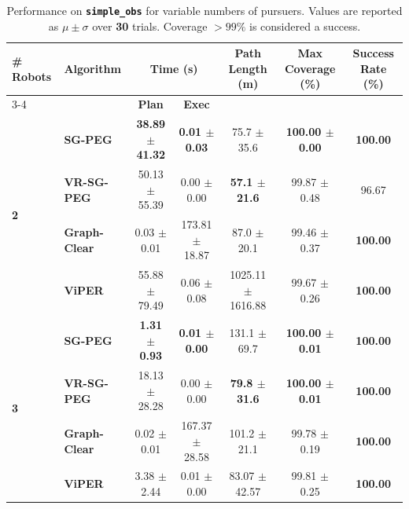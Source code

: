 \documentclass[conference]{IEEEtran}
\begin{document}
\begin{table}[t]
	\centering
	\caption{Performance on \textbf{\texttt{simple\_obs}} for variable numbers of pursuers. Values are reported as $\mu \pm \sigma$ over \textbf{30} trials. Coverage $>99\%$ is considered a success.}
	\label{tab:k_comparison}
	\renewcommand{\arraystretch}{1.2}
	\setlength{\tabcolsep}{6pt}
	
	\begin{tabular}{l l cc c c c}
		\toprule
		
		\multirow{2}{*}{\textbf{\# Robots}} & \multirow{2}{*}{\textbf{Algorithm}} 
		& \multicolumn{2}{c}{\textbf{Time (s)}} 
		& \multirow{2}{*}{\textbf{Path Length (m)}} 
		& \multirow{2}{*}{\textbf{Max Coverage (\%)}} 
		& \multirow{2}{*}{\textbf{Success Rate (\%)}} \\
		
		\cmidrule(lr){3-4}
		& & \textbf{Plan} & \textbf{Exec} & & & \\
		
		\midrule
		
		\multirow{4}{*}{\textbf{2}}
		& \textbf{SG-PEG}        & \textbf{38.89 $\pm$ 41.32} & \textbf{0.01 $\pm$ 0.03} & 75.7 $\pm$ 35.6 & \textbf{100.00 $\pm$ 0.00} & \textbf{100.00} \\
		& \textbf{VR-SG-PEG}     & 50.13 $\pm$ 55.39 & 0.00 $\pm$ 0.00 & \textbf{57.1 $\pm$ 21.6} & 99.87 $\pm$ 0.48 & 96.67 \\
		& \textbf{Graph-Clear}   & 0.03 $\pm$ 0.01 & 173.81 $\pm$ 18.87 & 87.0 $\pm$ 20.1 & 99.46 $\pm$ 0.37 & \textbf{100.00} \\
		& \textbf{ViPER}         & 55.88 $\pm$ 79.49 & 0.06 $\pm$ 0.08 & 1025.11 $\pm$ 1616.88 & 99.67 $\pm$ 0.26 & \textbf{100.00} \\

		\midrule
		
		\multirow{4}{*}{\textbf{3}}
		& \textbf{SG-PEG}        & \textbf{1.31 $\pm$ 0.93} & \textbf{0.01 $\pm$ 0.00} & 131.1 $\pm$ 69.7 & \textbf{100.00 $\pm$ 0.01} & \textbf{100.00} \\
		& \textbf{VR-SG-PEG}     & 18.13 $\pm$ 28.28 & 0.00 $\pm$ 0.00 & \textbf{79.8 $\pm$ 31.6} & \textbf{100.00 $\pm$ 0.01} & \textbf{100.00} \\
		& \textbf{Graph-Clear}   & 0.02 $\pm$ 0.01 & 167.37 $\pm$ 28.58 & 101.2 $\pm$ 21.1 & 99.78 $\pm$ 0.19 & \textbf{100.00} \\
		& \textbf{ViPER}         & 3.38 $\pm$ 2.44 & 0.01 $\pm$ 0.00 & 83.07 $\pm$ 42.57 & 99.81 $\pm$ 0.25 & \textbf{100.00} \\


\end{tabular}
\end{table}
\end{document}
